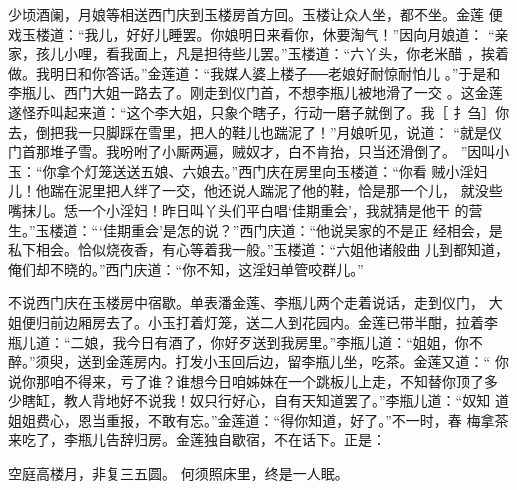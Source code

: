 少顷酒阑，月娘等相送西门庆到玉楼房首方回。玉楼让众人坐，都不坐。金莲
便戏玉楼道：“我儿，好好儿睡罢。你娘明日来看你，休要淘气！”因向月娘道：
“亲家，孩儿小哩，看我面上，凡是担待些儿罢。”玉楼道：“六丫头，你老米醋
，挨着做。我明日和你答话。”金莲道：“我媒人婆上楼子──老娘好耐惊耐怕儿
。”于是和李瓶儿、西门大姐一路去了。刚走到仪门首，不想李瓶儿被地滑了一交
。这金莲遂怪乔叫起来道：“这个李大姐，只象个瞎子，行动一磨子就倒了。我［
扌刍］你去，倒把我一只脚踩在雪里，把人的鞋儿也踹泥了！”月娘听见，说道：
“就是仪门首那堆子雪。我吩咐了小厮两遍，贼奴才，白不肯抬，只当还滑倒了。
”因叫小玉：“你拿个灯笼送送五娘、六娘去。”西门庆在房里向玉楼道：“你看
贼小淫妇儿！他踹在泥里把人绊了一交，他还说人踹泥了他的鞋，恰是那一个儿，
就没些嘴抹儿。恁一个小淫妇！昨日叫丫头们平白唱‘佳期重会’，我就猜是他干
的营生。”玉楼道：“‘佳期重会’是怎的说？”西门庆道：“他说吴家的不是正
经相会，是私下相会。恰似烧夜香，有心等着我一般。”玉楼道：“六姐他诸般曲
儿到都知道，俺们却不晓的。”西门庆道：“你不知，这淫妇单管咬群儿。”

不说西门庆在玉楼房中宿歇。单表潘金莲、李瓶儿两个走着说话，走到仪门，
大姐便归前边厢房去了。小玉打着灯笼，送二人到花园内。金莲已带半酣，拉着李
瓶儿道：“二娘，我今日有酒了，你好歹送到我房里。”李瓶儿道：“姐姐，你不
醉。”须臾，送到金莲房内。打发小玉回后边，留李瓶儿坐，吃茶。金莲又道：“
你说你那咱不得来，亏了谁？谁想今日咱姊妹在一个跳板儿上走，不知替你顶了多
少瞎缸，教人背地好不说我！奴只行好心，自有天知道罢了。”李瓶儿道：“奴知
道姐姐费心，恩当重报，不敢有忘。”金莲道：“得你知道，好了。”不一时，春
梅拿茶来吃了，李瓶儿告辞归房。金莲独自歇宿，不在话下。正是：

空庭高楼月，非复三五圆。
何须照床里，终是一人眠。